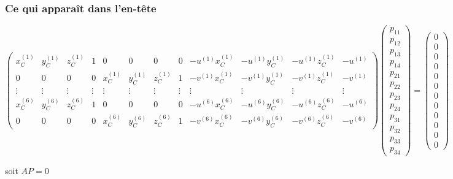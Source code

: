 \begin{frame}
\frametitle{Ce qui apparaît dans l'en-tête}
{\tiny
\[
\begin{pmatrix}
x_C^{(1)} & y_C^{(1)} & z_C^{(1)} & 1 & 0 & 0 & 0 & 0 & -u^{(1)}x_C^{(1)} & -u^{(1)}y_C^{(1)} & -u^{(1)}z_C^{(1)} & -u^{(1)} \\
0 & 0 & 0 & 0 & x_C^{(1)} & y_C^{(1)} & z_C^{(1)} & 1 & -v^{(1)}x_C^{(1)} & -v^{(1)}y_C^{(1)} & -v^{(1)}z_C^{(1)} & -v^{(1)} \\
\vdots & \vdots & \vdots & \vdots & \vdots & \vdots & \vdots & \vdots & \vdots & \vdots & \vdots & \vdots \\
x_C^{(6)} & y_C^{(6)} & z_C^{(6)} & 1 & 0 & 0 & 0 & 0 & -u^{(6)}x_C^{(6)} & -u^{(6)}y_C^{(6)} & -u^{(6)}z_C^{(6)} & -u^{(6)} \\
0 & 0 & 0 & 0 & x_C^{(6)} & y_C^{(6)} & z_C^{(6)} & 1 & -v^{(6)}x_C^{(6)} & -v^{(6)}y_C^{(6)} & -v^{(6)}z_C^{(6)} & -v^{(6)}
\end{pmatrix}
\begin{pmatrix}
p_{11}\\p_{12}\\p_{13}\\p_{14}\\
p_{21}\\p_{22}\\p_{23}\\p_{24}\\
p_{31}\\p_{32}\\p_{33}\\p_{34}
\end{pmatrix}
=
\begin{pmatrix}
0\\0\\0\\0\\0\\0\\0\\0\\0\\0\\0\\0
\end{pmatrix}
\]
}
\begin{center}
    soit \( AP = 0 \)
\end{center}
\end{frame}
